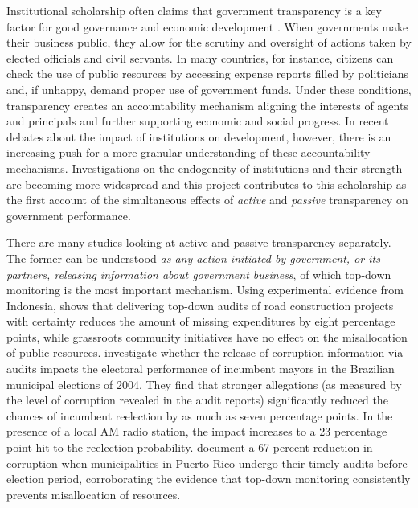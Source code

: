 \documentclass[11pt]{article}
\begin{document}
Institutional scholarship often claims that government transparency is a key factor for good governance and economic development \citep{KaufmannGovernanceMatters1999,BoRothsteinGoodGovernance2012}. When governments make their business public, they allow for the scrutiny and oversight of actions taken by elected officials and civil servants. In many countries, for instance, citizens can check the use of public resources by accessing expense reports filled by politicians and, if unhappy, demand proper use of government funds. Under these conditions, transparency creates an accountability mechanism aligning the interests of agents and principals and further supporting economic and social progress. In recent debates about the impact of institutions on development, however, there is an increasing push for a more granular understanding of these accountability mechanisms. Investigations on the endogeneity of institutions and their strength \citep{AcemogluChapterInstitutionsFundamental2005,LevitskyVariationInstitutionalStrength2009,DalBoInstitutionsBehaviorExperimental2010} are becoming more widespread and this project contributes to this scholarship as the first account of the simultaneous effects of \emph{active} and \emph{passive} transparency on government performance.

There are many studies looking at active and passive transparency separately. The former can be understood \emph{as any action initiated by government, or its partners, releasing information about government business}, of which top-down monitoring is the most important mechanism. Using experimental evidence from Indonesia, \citet{OlkenMonitoringCorruptionEvidence2007c} shows that delivering top-down audits of road construction projects with certainty reduces the amount of missing expenditures by eight percentage points, while grassroots community initiatives have no effect on the misallocation of public resources. \citet{FerrazExposingCorruptPoliticians2008b} investigate whether the release of corruption information via audits impacts the electoral performance of incumbent mayors in the Brazilian municipal elections of 2004. They find that stronger allegations (as measured by the level of corruption revealed in the audit reports) significantly reduced the chances of incumbent reelection by as much as seven percentage points. In the presence of a local AM radio station, the impact increases to a 23 percentage point hit to the reelection probability. \citet{BobonisMonitoringCorruptiblePoliticians2016} document a 67 percent reduction in corruption when municipalities in Puerto Rico undergo their timely audits before election period, corroborating the evidence that top-down monitoring consistently prevents misallocation of resources.
\end{document}
